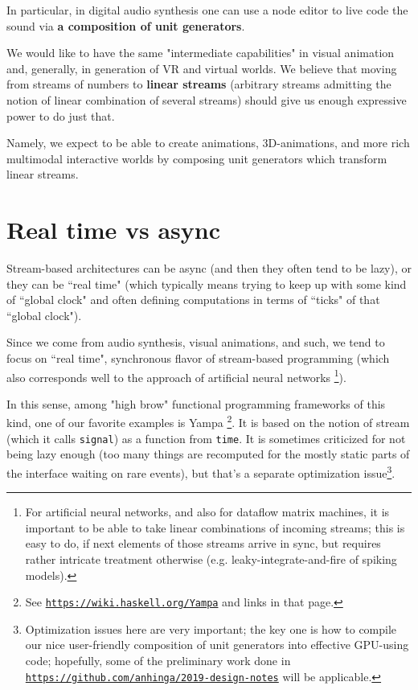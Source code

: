 \documentclass{article}
\begin{document}
In particular, in digital audio synthesis one can use a node editor to live code the sound via {\bf a composition of unit generators}.

We would like to have the same "intermediate capabilities" in visual animation and, generally, in generation of VR and virtual worlds. 
We believe that moving from streams of numbers to {\bf linear streams} (arbitrary streams admitting the notion of linear combination
of several streams) should give us enough expressive power to do just that.

Namely, we expect to be able to create animations, 3D-animations, and more rich multimodal interactive worlds by
composing unit generators which transform linear streams.

\section{Real time vs async}

Stream-based architectures can be async (and then they often tend to be lazy), or they can be ``real time"
(which typically means trying to keep up with some kind of ``global clock" and often defining computations in terms
of ``ticks" of that ``global clock").

Since we come from audio synthesis, visual animations, and such, we tend to focus on ``real time", synchronous
flavor of stream-based programming (which also corresponds well to the approach of artificial neural networks
\footnote{For artificial neural networks, and also for dataflow matrix machines, it is important to be able to
take linear combinations of incoming streams; this is easy to do, if next elements of those streams arrive in sync, but
requires rather intricate treatment otherwise (e.g. leaky-integrate-and-fire of spiking models).}).

In this sense, among "high brow" functional programming frameworks of this kind, one of our favorite examples is Yampa \footnote{See \href{https://wiki.haskell.org/Yampa}{\tt https://wiki.haskell.org/Yampa} and links in that page.}.
It is based on the notion of stream (which it calls {\tt signal}) as a function from {\tt time}. It is sometimes criticized for not being lazy enough
(too many things are recomputed for the mostly static parts of the interface waiting on rare events), but that's a separate
optimization issue\footnote{Optimization issues here are very important; the key one is how to compile our nice user-friendly composition of unit generators into effective GPU-using code; hopefully, some of the preliminary work done in
\href{https://github.com/anhinga/2019-design-notes}{\tt https://github.com/anhinga/2019-design-notes} will be applicable.}.  
\end{document}
